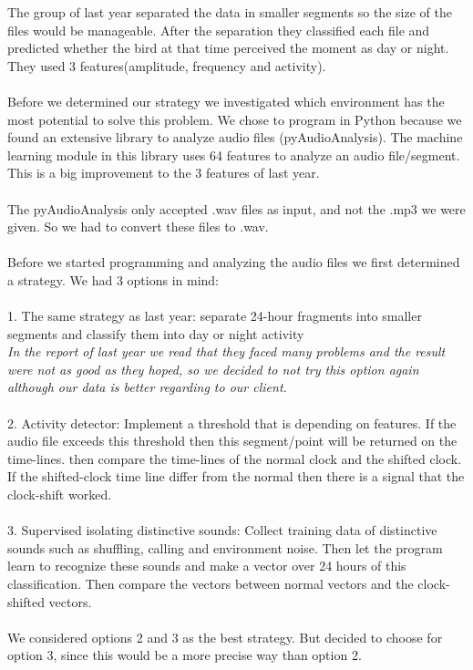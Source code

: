 \documentclass[a4paper]{article}
\begin{document}
The group of last year separated the data in smaller segments so the size of the files would be manageable. After the separation they classified each file and predicted whether the bird at that time perceived the moment as day or night. They used 3 features(amplitude, frequency and activity).\\\\
Before we determined our strategy we investigated which environment has the most potential to solve this problem. We chose to program in Python because we found an extensive library to analyze audio files (pyAudioAnalysis). The machine learning module in this library uses 64 features to analyze an audio file/segment. This is a big improvement to the 3 features of last year.\\\\
The pyAudioAnalysis only accepted .wav files as input, and not the .mp3 we were given. So we had to convert these files to .wav.\\\\
Before we started programming and analyzing the audio files we first determined a strategy. We had 3 options in mind:\\\\
1. The same strategy as last year: separate 24-hour fragments into smaller segments and classify them into day or night activity\\
\emph{In the report of last year we read that they faced many problems and the result were not as good as they hoped, so we decided to not try this option again although our data is better regarding to our client.}\\\\
2. Activity detector: Implement a threshold that is depending on features. If the audio file exceeds this threshold then this segment/point will be returned on the time-lines. then compare the time-lines of the normal clock and the shifted clock. If the shifted-clock time line differ from the normal then there is a signal that the clock-shift worked.\\\\
3. Supervised isolating distinctive sounds: Collect training data of distinctive sounds such as shuffling, calling and environment noise. Then let the program learn to recognize these sounds and make a vector over 24 hours of this classification. Then compare the vectors between normal vectors and the clock-shifted vectors. \\\\
We considered options 2 and 3 as the best strategy. But decided to choose for option 3, since this would be a more precise way than option 2. \\\\
\end{document}
